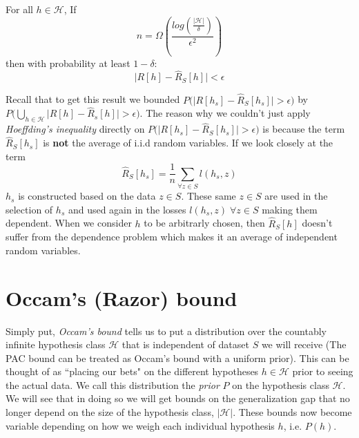 \documentclass{article}
\begin{document}

\begin{thm} For all $h \in \mathcal{H}$, If
\[
	n=\Omega\left(\frac{log(\frac{|\mathcal{H}|}{\delta})}{\epsilon^2}\right)
\]
then with probability at least $1-\delta$:
\[
\big|R[h]-\hat{R}_S[h] \big|<\epsilon
\]
\end{thm}




Recall that to get this result we bounded $P \big( \big|R[h_s]-\hat{R}_S[h_s] \big|>\epsilon \big)$ by $P \big( \bigcup_{h \in \mathcal{H}} \big|R[h]-\hat{R}_s[h] \big|>\epsilon \big)$. 
The reason why we couldn't just apply \textit{Hoeffding's inequality} directly on $P \big( \big|R[h_s]-\hat{R}_S[h_s] \big|>\epsilon \big)$ is because the term $\hat{R}_S[h_s]$ is \textbf{not} the average of i.i.d random variables. If we look closely at the term  $$\hat{R}_S[h_s] = \frac{1}{n} \sum_{\forall z \in S} l(h_s,z) $$
$h_s$ is constructed based on the data $z \in S$. These same $z \in S$ are used in the selection of $h_s$ and used again in the losses $l(h_s,z) \; \forall z \in S$ making them dependent. When we consider $h$ to be arbitrarly chosen, then $\hat{R}_S[h]$ doesn't suffer from the dependence problem which makes it an average of independent random variables.


\section{Occam's (Razor) bound } 

Simply put, \emph{Occam's bound} tells us to put a distribution over the countably infinite hypothesis class $\mathcal{H}$ that is independent of dataset $S$ we will receive (The PAC bound can be treated as Occam's bound with a uniform prior).
This can be thought of as ``placing our bets" on the different hypotheses $h \in \mathcal{H}$ prior to seeing the actual data.
We call this distribution the \textit{prior} $P$ on the hypothesis class $\mathcal{H}$. We will see that in doing so we will get bounds on the generalization gap that no longer depend on the size of the hypothesis class, $|\mathcal{H}|$. These bounds now become variable depending on how we weigh each individual hypothesis $h$, i.e. $P(h)$.
\end{document}
